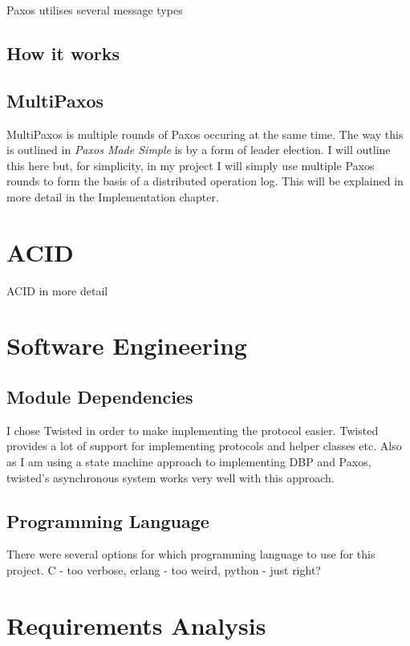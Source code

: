 \documentclass[12pt,twoside,notitlepage]{report}
\begin{document}
Paxos utilises several message types

\subsection{How it works}

\subsection{MultiPaxos}

MultiPaxos is multiple rounds of Paxos occuring at the same time. The way this is outlined in
\emph{Paxos Made Simple} is by a form of leader election. I will outline this here but, for
simplicity, in my project I will simply use multiple Paxos rounds to form the basis of a
distributed operation log. This will be explained in more detail in the Implementation chapter.

\section{ACID}

ACID in more detail


\section{Software Engineering}

\subsection{Module Dependencies}

I chose Twisted in order to make implementing the protocol easier. Twisted provides a lot of
support for implementing protocols and helper classes etc. Also as I am using a state machine
approach to implementing DBP and Paxos, twisted's asynchronous system works very well with this
approach.

\subsection{Programming Language}

There were several options for which programming language to use for this project. C - too
verbose, erlang - too weird, python - just right?

\section{Requirements Analysis}
\end{document}
